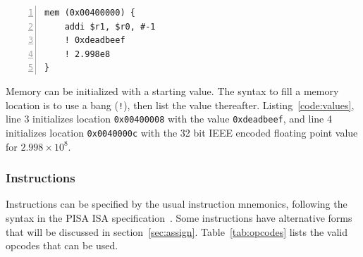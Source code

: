 \begin{lstlisting}[label=code:values,caption=Code example of immediate values and initialized memory locations,basicstyle=\footnotesize,numbers=left,numberstyle=\tiny,stepnumber=1, numbersep=6pt,frame=single,captionpos=b,escapechar=@]
mem (0x00400000) {
    addi $r1, $r0, #-1
    ! 0xdeadbeef
    ! 2.998e8
}
\end{lstlisting}

Memory can be initialized with a starting value.  The syntax 
to fill a memory location is to use a bang (\texttt{!}), then 
list the value thereafter.  Listing~\ref{code:values}, line 3 
initializes location \texttt{0x00400008} with the value \texttt{0xdeadbeef}, 
and line 4 initializes location \texttt{0x0040000c} with 
the 32 bit IEEE encoded floating point value for $2.998\times10^8$.

\subsubsection{Instructions}

Instructions can be specified by the usual instruction
mnemonics, following the syntax in the PISA ISA specification~\cite{burger97}.
Some instructions have alternative forms that will be 
discussed in section~\ref{sec:assign}.  Table~\ref{tab:opcodes}
lists the valid opcodes that can be used.

